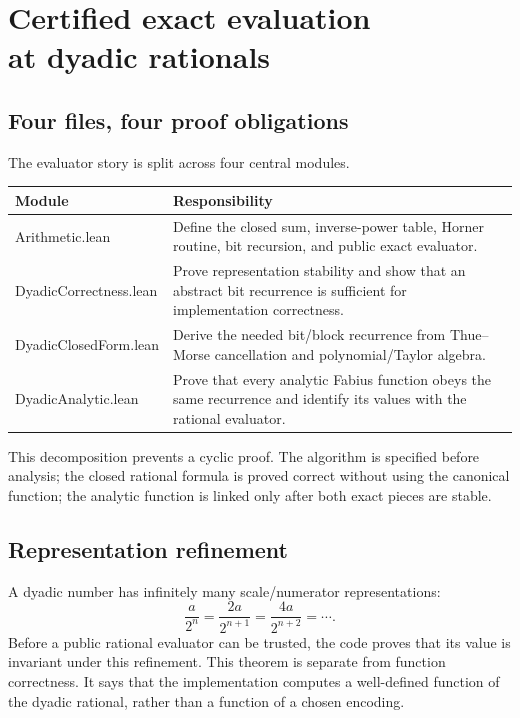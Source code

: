 \documentclass[11pt,a4paper,openany]{book}
\def\module#1{#1.lean}
\newcommand{\module}[1]{\nolinkurl{#1.lean}}
\begin{document}
\chapter[Certified exact evaluation at dyadic rationals]{Certified exact evaluation\\at dyadic rationals}
\label{ch:dyadic}

\section{Four files, four proof obligations}
The evaluator story is split across four central modules.

\begin{longtable}{@{}>{\raggedright\arraybackslash}p{}p{}@{}}
\toprule
Module & Responsibility \\
\midrule
\endhead
\module{Arithmetic} & Define the closed sum, inverse-power table, Horner
routine, bit recursion, and public exact evaluator. \\
\module{DyadicCorrectness} & Prove representation stability and show that an
abstract bit recurrence is sufficient for implementation correctness. \\
\module{DyadicClosedForm} & Derive the needed bit/block recurrence from
Thue--Morse cancellation and polynomial/Taylor algebra. \\
\module{DyadicAnalytic} & Prove that every analytic Fabius function obeys the
same recurrence and identify its values with the rational evaluator. \\
\bottomrule
\end{longtable}

This decomposition prevents a cyclic proof.  The algorithm is specified before
analysis; the closed rational formula is proved correct without using the
canonical function; the analytic function is linked only after both exact
pieces are stable.

\section{Representation refinement}
A dyadic number has infinitely many scale/numerator representations:
\[
 \frac{a}{2^n}=\frac{2a}{2^{n+1}}=\frac{4a}{2^{n+2}}=\cdots.
\]
Before a public rational evaluator can be trusted, the code proves that its
value is invariant under this refinement.  This theorem is separate from
function correctness.  It says that the implementation computes a
well-defined function of the dyadic rational, rather than a function of a
chosen encoding.
\end{document}
